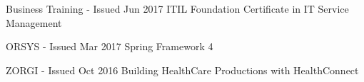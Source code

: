 

\begin{cventries}

  \cventry
    {Business Training - Issued Jun 2017} %
    {ITIL Foundation Certificate in IT Service Management} %
    {} %
    {} %
    {
    }
    
  \cventry
    {ORSYS - Issued Mar 2017} %
    {Spring Framework 4} %
    {} %
    {} %
    {
    }
    
    
  \cventry
    {ZORGI - Issued Oct 2016} %
    {Building HealthCare Productions with HealthConnect} %
    {} %
    {} %
    {
    }

\end{cventries}
